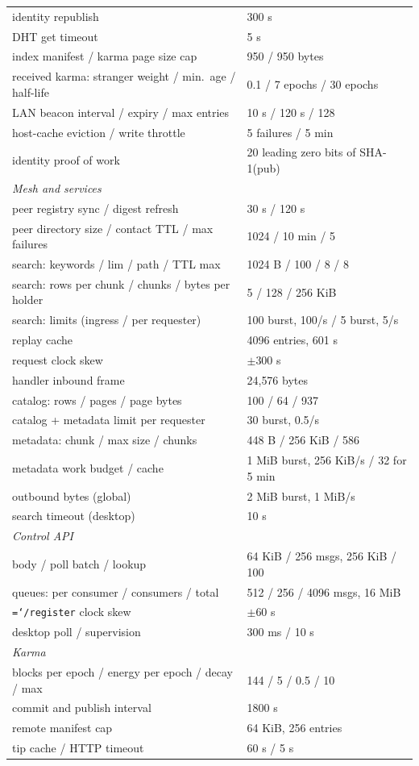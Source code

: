 \documentclass[11pt,a4paper]{article}
\newcommand{\code}[1]{\texttt{\hyphenchar\font=`\-\relax #1}}
\DeclareRobustCommand{\_}{\origunderscore\allowbreak}
\begin{document}
\begin{longtable}{p{}p{}}
identity republish & 300 s\\
DHT get timeout & 5 s\\
index manifest / karma page size cap & 950 / 950 bytes\\
received karma: stranger weight / min.\ age / half-life & 0.1 / 7 epochs / 30 epochs\\
LAN beacon interval / expiry / max entries & 10 s / 120 s / 128\\
host-cache eviction / write throttle & 5 failures / 5 min\\
identity proof of work & 20 leading zero bits of SHA-1(pub)\\
\multicolumn{2}{l}{\emph{Mesh and services}}\\
peer registry sync / digest refresh & 30 s / 120 s\\
peer directory size / contact TTL / max failures & 1024 / 10 min / 5\\
search: keywords / lim / path / TTL max & 1024 B / 100 / 8 / 8\\
search: rows per chunk / chunks / bytes per holder & 5 / 128 / 256 KiB\\
search: limits (ingress / per requester) & 100 burst, 100/s / 5 burst, 5/s\\
replay cache & 4096 entries, 601 s\\
request clock skew & $\pm$300 s\\
handler inbound frame & 24{,}576 bytes\\
catalog: rows / pages / page bytes & 100 / 64 / 937\\
catalog + metadata limit per requester & 30 burst, 0.5/s\\
metadata: chunk / max size / chunks & 448 B / 256 KiB / 586\\
metadata work budget / cache & 1 MiB burst, 256 KiB/s / 32 for 5 min\\
outbound bytes (global) & 2 MiB burst, 1 MiB/s\\
search timeout (desktop) & 10 s\\
\multicolumn{2}{l}{\emph{Control API}}\\
body / poll batch / lookup & 64 KiB / 256 msgs, 256 KiB / 100\\
queues: per consumer / consumers / total & 512 / 256 / 4096 msgs, 16 MiB\\
\code{/register} clock skew & $\pm$60 s\\
desktop poll / supervision & 300 ms / 10 s\\
\multicolumn{2}{l}{\emph{Karma}}\\
blocks per epoch / energy per epoch / decay / max & 144 / 5 / 0.5 / 10\\
commit and publish interval & 1800 s\\
remote manifest cap & 64 KiB, 256 entries\\
tip cache / HTTP timeout & 60 s / 5 s\\
\bottomrule
\end{longtable}
\end{document}
